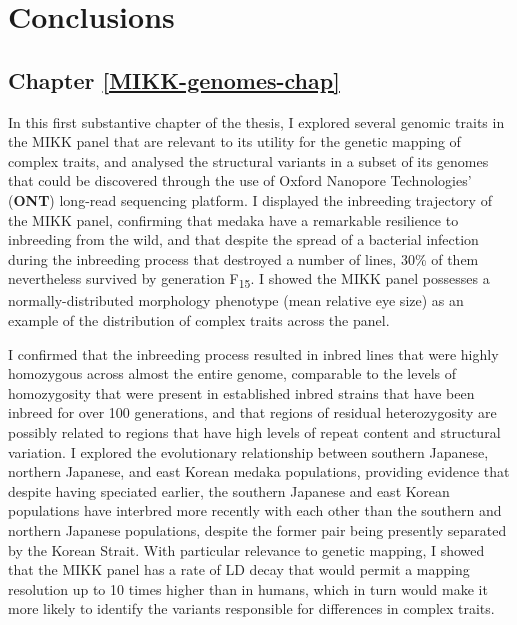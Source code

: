 \documentclass[
]{book}
\begin{document}
\hypertarget{conclusions}{%
\chapter*{Conclusions}\label{conclusions}}

\hypertarget{chapter-refmikk-genomes-chap}{%
\section*{Chapter \ref{MIKK-genomes-chap}}\label{chapter-refmikk-genomes-chap}}

In this first substantive chapter of the thesis, I explored several genomic traits in the MIKK panel that are relevant to its utility for the genetic mapping of complex traits, and analysed the structural variants in a subset of its genomes that could be discovered through the use of Oxford Nanopore Technologies' (\textbf{ONT}) long-read sequencing platform. I displayed the inbreeding trajectory of the MIKK panel, confirming that medaka have a remarkable resilience to inbreeding from the wild, and that despite the spread of a bacterial infection during the inbreeding process that destroyed a number of lines, 30\% of them nevertheless survived by generation F\textsubscript{15}. I showed the MIKK panel possesses a normally-distributed morphology phenotype (mean relative eye size) as an example of the distribution of complex traits across the panel.

I confirmed that the inbreeding process resulted in inbred lines that were highly homozygous across almost the entire genome, comparable to the levels of homozygosity that were present in established inbred strains that have been inbreed for over 100 generations, and that regions of residual heterozygosity are possibly related to regions that have high levels of repeat content and structural variation. I explored the evolutionary relationship between southern Japanese, northern Japanese, and east Korean medaka populations, providing evidence that despite having speciated earlier, the southern Japanese and east Korean populations have interbred more recently with each other than the southern and northern Japanese populations, despite the former pair being presently separated by the Korean Strait. With particular relevance to genetic mapping, I showed that the MIKK panel has a rate of LD decay that would permit a mapping resolution up to 10 times higher than in humans, which in turn would make it more likely to identify the variants responsible for differences in complex traits.
\end{document}
